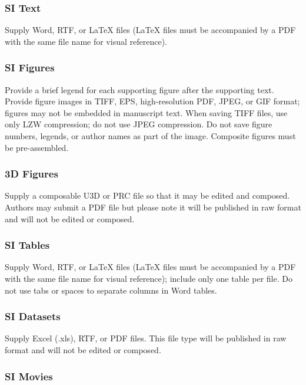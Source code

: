 \documentclass[9pt,twocolumn,twoside]{pnas-new}
\begin{document}
\subsubsection*{SI Text}

Supply Word, RTF, or LaTeX files (LaTeX files must be accompanied by a PDF with the same file name for visual reference).

\subsubsection*{SI Figures}

Provide a brief legend for each supporting figure after the supporting text. Provide figure images in TIFF, EPS, high-resolution PDF, JPEG, or GIF format; figures may not be embedded in manuscript text. When saving TIFF files, use only LZW compression; do not use JPEG compression. Do not save figure numbers, legends, or author names as part of the image. Composite figures must be pre-assembled.

\subsubsection*{3D Figures}

Supply a composable U3D or PRC file so that it may be edited and composed. Authors may submit a PDF file but please note it will be published in raw format and will not be edited or composed.

\subsubsection*{SI Tables}

Supply Word, RTF, or LaTeX files (LaTeX files must be accompanied by a PDF with the same file name for visual reference); include only one table per file. Do not use tabs or spaces to separate columns in Word tables.

\subsubsection*{SI Datasets} 

Supply Excel (.xls), RTF, or PDF files. This file type will be published in raw format and will not be edited or composed. 

\subsubsection*{SI Movies}
\end{document}
